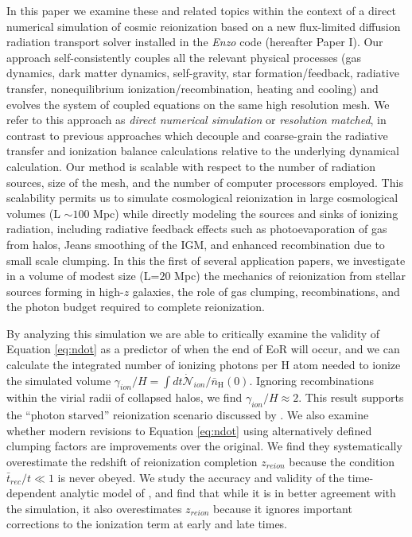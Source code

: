 In this paper we examine these and related topics within the context of a direct numerical simulation of cosmic reionization based on a new flux-limited diffusion radiation transport solver installed in the {\em Enzo} code \citep{NormanEtAl2013} (hereafter Paper I).
Our approach self-consistently couples all the relevant physical processes 
(gas dynamics, dark matter dynamics, self-gravity, star formation/feedback, 
radiative transfer, nonequilibrium ionization/recombination, heating and cooling) and evolves the
system of coupled equations on the same high resolution mesh. We refer to this
approach as {\em direct numerical simulation} or {\em resolution matched}, in contrast to previous approaches 
which decouple and coarse-grain the radiative transfer and ionization balance 
calculations relative to the underlying dynamical calculation.
Our method is
scalable with respect to the number of radiation sources, size of the mesh, and the
number of computer processors employed.
This scalability permits us to simulate cosmological reionization in large cosmological
volumes (L $\sim100$ Mpc) while directly modeling the sources and sinks of ionizing 
radiation,  
including radiative feedback effects such as photoevaporation of gas from halos, 
Jeans smoothing of the IGM, and enhanced recombination due to small scale clumping. 
In this the first of several application papers, we investigate in a volume of modest size (L=$20$ Mpc) the mechanics of reionization from stellar sources forming in high-$z$ galaxies, the role of gas clumping, recombinations, and the photon budget required to complete reionization.

By analyzing this simulation we are able to critically examine the validity of  Equation \eqref{eq:ndot} as a predictor of when the end of EoR will occur, and we can calculate the integrated number of ionizing photons 
per H atom needed to ionize the simulated volume $\gamma_{ion}/H=\int dt \dot{\mathcal{N}}_{ion} / \bar{n}_\mathrm{H}(0)$. Ignoring recombinations within the virial radii of collapsed halos, we find $\gamma_{ion}/H \approx 2$. This result
supports the ``photon starved'' reionization scenario discussed by \cite{BoltonHaehnelt2007}.
We also examine whether modern revisions to Equation \eqref{eq:ndot} using alternatively defined 
clumping factors \citep{PawlikEtAl2009, RaicevicTheuns2011, FinlatorEtAl2012, ShullEtAl2012} are 
improvements over the original. We find they systematically overestimate the redshift of reionization completion $z_{reion}$ because the condition $\bar{t}_{rec}/t \ll 1$ is never obeyed.  We study the accuracy and validity of the time-dependent analytic model of \cite{MadauEtAl1999}, and find that while it is in better agreement with the simulation, it also overestimates $z_{reion}$ because it ignores important corrections to the ionization term at early and late times.

